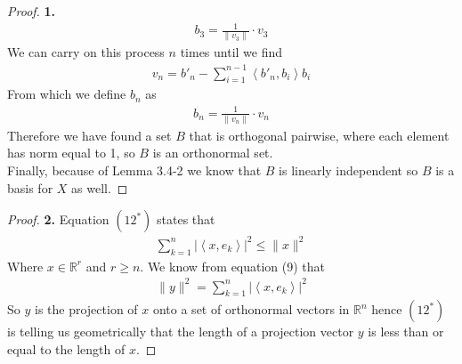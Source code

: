 \documentclass[11pt]{article}
\newcommand{\R}{\mathbb{R}}
\newcommand{\inprd}[1]{\left\langle{#1}\right\rangle}
\theoremstyle{definition}
\begin{document}
\begin{proof}{\textbf{1.}}
\begin{align*}
    b_3 = \frac{1}{\|v_3\|}\cdot v_3
\end{align*}
We can carry on this process $n$ times until we find
\begin{align*}
    v_n = b'_n - \sum_{i =1}^{n-1} \inprd{b'_n, b_i}b_i
\end{align*}
From which we define $b_n$ as
\begin{align*}
    b_n = \frac{1}{\|v_n\|}\cdot v_n
\end{align*}
Therefore we have found a set $B$ that is orthogonal pairwise, where each
element has norm equal to 1, so $B$ is an orthonormal set.
\\
Finally, because of Lemma 3.4-2 we know that $B$ is linearly independent so $B$
is a basis for $X$ as well.
\end{proof}

\cleardoublepage
\begin{proof}{\textbf{2.}}
Equation $(12^*)$ states that
\begin{align*}
    \sum_{k=1}^n |\inprd{x, e_k}|^2 \leq \|x\|^2
\end{align*}
Where $x \in \R^r$ and $r \geq n$.
We know from equation (9) that
\begin{align*}
    \|y\|^2 = \sum_{k=1}^n |\inprd{x, e_k}|^2
\end{align*}
So $y$ is the projection of $x$ onto a set of orthonormal vectors in $\R^n$
hence $(12^*)$ is telling us geometrically that the length of a projection
vector $y$ is less than or equal to the length of $x$.
\end{proof}
\end{document}
